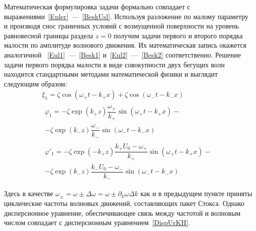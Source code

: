 Математическая формулировка задачи формально совпадает с выражениями~\eqref{Euler}~---~\eqref{BeskUsl}. Используя разложение по малому параметру и производя снос граничных условий с возмущенной поверхности на уровень равновесной границы раздела  $ z=0 $ получим задачи первого и второго порядка малости по амплитуде волнового движения. Их математическая запись окажется аналогичной ~\eqref{Eul1}~---~\eqref{Besk1} и~\eqref{Eul2}~---~\eqref{Besk2} соответственно. Решение задачи первого порядка малости в виде совокупности двух бегущих волн находится стандартными методами математической физики и выглядит следующим образом:
\begin{gather}
\xi_{1}=\zeta \cos \left( \omega_{+} t -k_{+} x \right)+\zeta \cos \left( \omega_{-} t -k_{-} x \right)\label{ReshPackKH1Xi}
\\
\begin{gathered}
\varphi_{1} = -\zeta \exp \left( k_{+} z\right) \dfrac{\omega_{+}}{k_{+}}\sin \left( \omega_{+} t -k_{+} x \right)-
\\
 -\zeta \exp \left( k_{-} z\right) \dfrac{\omega_{-}}{k_{-}}\sin \left( \omega_{-} t -k_{-} x \right)\label{ReshPackKH1Phi}
 \end{gathered}
\\
\begin{gathered}
\varphi'_{1} = -\zeta \exp \left(- k_{+} z\right) \dfrac{k_{+} U_{0}-\omega_{+}}{k_{+}}\sin \left( \omega_{+} t -k_{+} x \right) -\\
-\zeta \exp \left( k_{-} z\right) \dfrac{k_{-}U_{0}-\omega_{-}}{k_{-}}\sin \left( \omega_{-} t -k_{-} x \right)
\label{ReshPackKH1Phi'}
\end{gathered}
\end{gather}

	  	
Здесь в качестве $ \omega_{\pm}=\omega \pm \Delta \omega =\omega \pm \partial_{k} \omega \Delta k $  как и в предыдущем пункте приняты циклические частоты волновых движений, составляющих пакет Стокса. Однако дисперсионное уравнение, обеспечивающее связь между частотой и волновым числом совпадает с дисперсионным уравнением~\eqref{DispUrKH}. 

